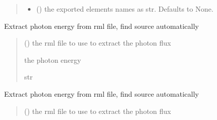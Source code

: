 \documentclass[letterpaper,10pt,english]{sphinxmanual}
\begin{document}
\begin{fulllineitems}
\begin{fulllineitems}
\begin{quote}
\begin{description}
\begin{itemize}
\item {} 
\sphinxAtStartPar
{} (\sphinxstyleliteralemphasis{\sphinxupquote{, }}) \textendash{} the exported elements names as str. Defaults to None.

\end{itemize}

\end{description}\end{quote}

\end{fulllineitems}


\begin{fulllineitems}
\label{\detokenize{API:raypyng.postprocessing.PostProcess.extract_bw_from_source}}
\pysigstartsignatures
\pysiglinewithargsret
{}
{}
{}
\pysigstopsignatures
\sphinxAtStartPar
Extract photon energy from rml file, find source automatically
\begin{quote}\begin{description}
\sphinxAtStartPar
{} () \textendash{} the rml file to use to extract the photon flux

\sphinxAtStartPar
the photon energy

\sphinxAtStartPar
str

\end{description}\end{quote}

\end{fulllineitems}


\begin{fulllineitems}
\label{\detokenize{API:raypyng.postprocessing.PostProcess.extract_energy_from_source}}
\pysigstartsignatures
\pysiglinewithargsret
{}
{}
{}
\pysigstopsignatures
\sphinxAtStartPar
Extract photon energy from rml file, find source automatically
\begin{quote}\begin{description}
\sphinxAtStartPar
{} () \textendash{} the rml file to use to extract the photon flux


\end{description}
\end{quote}
\end{fulllineitems}
\end{fulllineitems}
\end{document}
